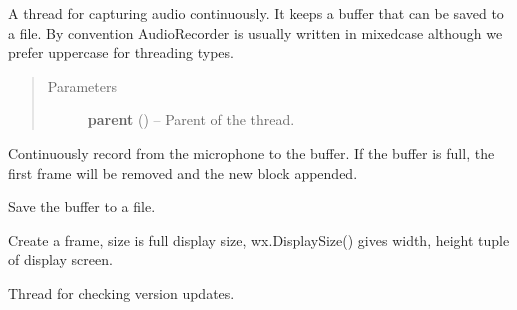 \documentclass[letterpaper,10pt,english]{sphinxmanual}
\begin{document}
\begin{fulllineitems}
\label{api:wos.AudioRecorder}
A thread for capturing audio continuously.
It keeps a buffer that can be saved to a file.
By convention AudioRecorder is usually written in mixedcase although we
prefer uppercase for threading types.
\begin{quote}\begin{description}
\item[{Parameters}] \leavevmode
\textbf{parent} () -- Parent of the thread.

\end{description}\end{quote}

\begin{fulllineitems}
\label{api:wos.AudioRecorder.run}
Continuously record from the microphone to the buffer.
If the buffer is full, the first frame will be removed and
the new block appended.

\end{fulllineitems}


\begin{fulllineitems}
\label{api:wos.AudioRecorder.save}
Save the buffer to a file.

\end{fulllineitems}


\end{fulllineitems}


\begin{fulllineitems}
\label{api:wos.BlackOverlay}
Create a frame, size is full display size, wx.DisplaySize()
gives width, height tuple of display screen.

\end{fulllineitems}


\begin{fulllineitems}
\label{api:wos.CHECK_UPDATE}
Thread for checking version updates.

\end{fulllineitems}
\end{document}

